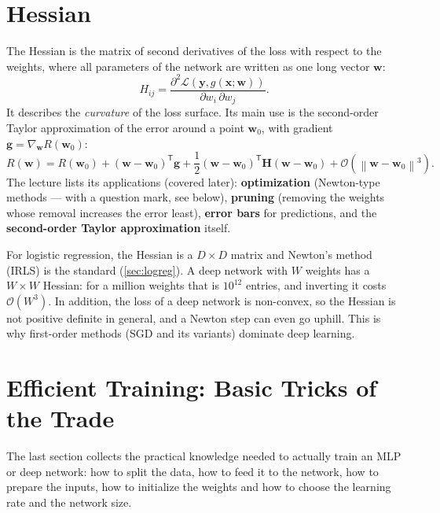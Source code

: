 \documentclass[11pt, oneside]{book}
\newcommand{\grad}{\nabla}               %
\newcommand{\norm}[1]{\left\lVert #1 \right\rVert}
\newcommand{\T}{^{\mathsf{T}}}           %
\newcommand{\loss}{\mathcal{L}}          %
\newcommand{\params}{\boldsymbol{\theta}}   %
\newcommand{\bigO}[1]{\mathcal{O}\!\left(#1\right)}
\newcommand{\bx}{\bm{x}}        \newcommand{\by}{\bm{y}}
\newcommand{\bw}{\bm{w}}        \newcommand{\bW}{\bm{W}}
\newcommand{\bg}{\bm{g}}        \newcommand{\be}{\bm{e}}
\newcommand{\bH}{\bm{H}}        \newcommand{\bR}{\bm{R}}
\let\originalsection\section
\renewcommand{\section}{\Needspace{7\baselineskip}\originalsection}
\begin{document}
\section{Hessian}
\label{sec:hessian}

The Hessian is the matrix of second derivatives of the loss with respect to
the weights, where all parameters of the network are written as one long
vector $\bw$:
\[
  H_{ij} = \frac{\partial^2 \loss(\by, g(\bx; \bw))}{\partial w_i\,\partial w_j} .
\]
It describes the \emph{curvature} of the loss surface. Its main use is the
second-order Taylor approximation of the error around a point $\bw_0$,
with gradient $\bg = \grad_{\bw}R(\bw_0)$:
\[
  R(\bw) = R(\bw_0) + (\bw - \bw_0)\T\bg
           + \frac12(\bw - \bw_0)\T\bH(\bw - \bw_0)
           + \bigO{\norm{\bw - \bw_0}^3} .
\]
The lecture lists its applications (covered later): \textbf{optimization}
(Newton-type methods --- with a question mark, see below), \textbf{pruning}
(removing the weights whose removal increases the error least),
\textbf{error bars} for predictions, and the \textbf{second-order Taylor
approximation} itself.

\begin{notebox}[title={Why not just use Newton's method for deep networks?}]
For logistic regression, the Hessian is a $D \times D$ matrix and Newton's
method (IRLS) is the standard (\cref{sec:logreg}). A deep network with $W$
weights has a $W \times W$ Hessian: for a million weights that is $10^{12}$
entries, and inverting it costs $\bigO{W^3}$. In addition, the loss of a deep
network is non-convex, so the Hessian is not positive definite in general,
and a Newton step can even go uphill. This is why first-order methods (SGD
and its variants) dominate deep learning.
\end{notebox}


\section{Efficient Training: Basic Tricks of the Trade}
\label{sec:tricks}

The last section collects the practical knowledge needed to actually train
an MLP or deep network: how to split the data, how to feed it to the
network, how to prepare the inputs, how to initialize the weights and how to
choose the learning rate and the network size.
\end{document}
